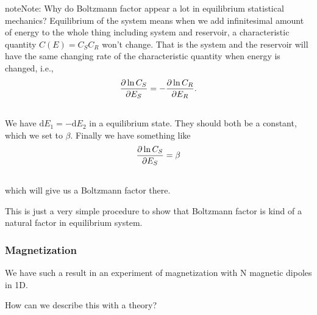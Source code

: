 \documentclass[letterpaper,10pt,english]{sphinxmanual}
\begin{document}
\begin{notice}{note}{Note:}
Why do Boltzmann factor appear a lot in equilibrium statistical mechanics? Equilibrium of the system means when we add infinitesimal amount of energy to the whole thing including system and reservoir, a characteristic quantity $C(E) = C_S C_R$ won't change. That is the system and the reservoir will have the same changing rate of the characteristic quantity when energy is changed, i.e.,
\begin{gather}
\begin{split}\frac{\partial \ln C_S}{\partial E_S} = - \frac{\partial \ln C_R}{\partial E_R} .\end{split}\notag\\\begin{split}\end{split}\notag
\end{gather}
We have $\mathrm dE_1 = -\mathrm dE_2$ in a equilibrium state. They should both be a constant, which we set to $\beta$. Finally we have something like
\begin{gather}
\begin{split}\frac{\partial \ln C_S}{\partial E_S} = \beta\end{split}\notag\\\begin{split}\end{split}\notag
\end{gather}
which will give us a Boltzmann factor there.

This is just a very simple procedure to show that Boltzmann factor is kind of a natural factor in equilibrium system.
\end{notice}


\subsubsection{Magnetization}
\label{equilibrium/week1:magnetization}
We have such a result in an experiment of magnetization with N magnetic dipoles in 1D.

How can we describe this with a theory?
\end{document}
